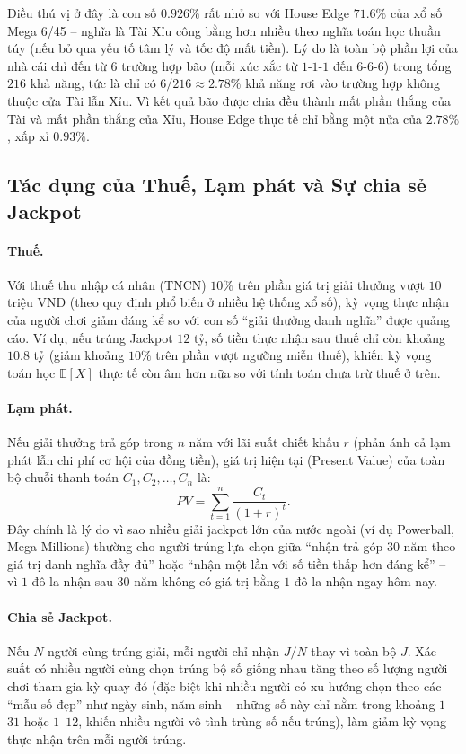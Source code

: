 \documentclass[12pt,a4paper]{article}
\theoremstyle{coloredthm}
\theoremstyle{coloreddef}
\theoremstyle{remark}
\begin{document}
\begin{giaithich}
Điều thú vị ở đây là con số $0.926\%$ rất nhỏ so với House Edge $71.6\%$ của xổ số Mega 6/45 -- nghĩa là Tài Xỉu công bằng hơn nhiều theo nghĩa toán học thuần túy (nếu bỏ qua yếu tố tâm lý và tốc độ mất tiền). Lý do là toàn bộ phần lợi của nhà cái chỉ đến từ $6$ trường hợp bão (mỗi xúc xắc từ $1$-$1$-$1$ đến $6$-$6$-$6$) trong tổng $216$ khả năng, tức là chỉ có $6/216 \approx 2.78\%$ khả năng rơi vào trường hợp không thuộc cửa Tài lẫn Xỉu. Vì kết quả bão được chia đều thành mất phần thắng của Tài và mất phần thắng của Xỉu, House Edge thực tế chỉ bằng một nửa của $2.78\%$, xấp xỉ $0.93\%$.
\end{giaithich}

\subsection{Tác dụng của Thuế, Lạm phát và Sự chia sẻ Jackpot}

\paragraph{Thuế.} Với thuế thu nhập cá nhân (TNCN) $10\%$ trên phần giá trị giải thưởng vượt $10$ triệu VNĐ (theo quy định phổ biến ở nhiều hệ thống xổ số), kỳ vọng thực nhận của người chơi giảm đáng kể so với con số ``giải thưởng danh nghĩa'' được quảng cáo. Ví dụ, nếu trúng Jackpot $12$ tỷ, số tiền thực nhận sau thuế chỉ còn khoảng $10.8$ tỷ (giảm khoảng $10\%$ trên phần vượt ngưỡng miễn thuế), khiến kỳ vọng toán học $\mathbb{E}[X]$ thực tế còn âm hơn nữa so với tính toán chưa trừ thuế ở trên.

\paragraph{Lạm phát.} Nếu giải thưởng trả góp trong $n$ năm với lãi suất chiết khấu $r$ (phản ánh cả lạm phát lẫn chi phí cơ hội của đồng tiền), giá trị hiện tại (Present Value) của toàn bộ chuỗi thanh toán $C_1, C_2, \dots, C_n$ là:
\[
PV = \sum_{t=1}^{n} \frac{C_t}{(1+r)^t}.
\]
Đây chính là lý do vì sao nhiều giải jackpot lớn của nước ngoài (ví dụ Powerball, Mega Millions) thường cho người trúng lựa chọn giữa ``nhận trả góp $30$ năm theo giá trị danh nghĩa đầy đủ'' hoặc ``nhận một lần với số tiền thấp hơn đáng kể'' -- vì $1$ đô-la nhận sau $30$ năm không có giá trị bằng $1$ đô-la nhận ngay hôm nay.

\paragraph{Chia sẻ Jackpot.} Nếu $N$ người cùng trúng giải, mỗi người chỉ nhận $J/N$ thay vì toàn bộ $J$. Xác suất có nhiều người cùng chọn trúng bộ số giống nhau tăng theo số lượng người chơi tham gia kỳ quay đó (đặc biệt khi nhiều người có xu hướng chọn theo các ``mẫu số đẹp'' như ngày sinh, năm sinh -- những số này chỉ nằm trong khoảng $1$--$31$ hoặc $1$--$12$, khiến nhiều người vô tình trùng số nếu trúng), làm giảm kỳ vọng thực nhận trên mỗi người trúng.
\end{document}
